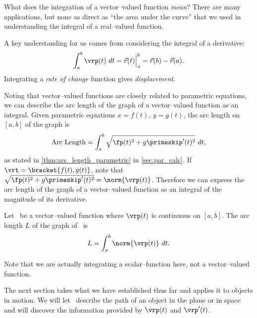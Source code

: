 What does the integration of a vector--valued function \emph{mean}? There are many applications, but none as direct as ``the area under the curve'' that we used in understanding the integral of a real--valued function.

A key understanding for us comes from considering the integral of a derivative: $$\int_a^b \vrp(t)\ dt = \vec r(t)\Big|_a^b = \vec r(b)-\vec r(a).$$ Integrating a \emph{rate of change} function gives \emph{displacement}.

Noting that vector--valued functions are closely related to parametric equations, we can describe the arc length of the graph of a vector--valued function as an integral. Given parametric equations $x=f(t)$, $y=g(t)$, the arc length on $[a,b]$ of the graph is
$$\text{Arc Length} = \int_a^b\sqrt{\fp(t)^2+g\primeskip'(t)^2}\ dt,$$
as stated in \autoref{thm:arc_length_parametric} in \autoref{sec:par_calc}. If $\vrt =\bracket{f(t), g(t)}$, note that $\sqrt{\fp(t)^2+g\primeskip'(t)^2} = \norm{\vrp(t)}$. Therefore we can express the arc length of the graph of a vector--valued function as an integral of the magnitude of its derivative.

{Let \vrt\ be a vector--valued function where $\vrp(t)$ is continuous on $[a,b]$. The arc length $L$ of the graph of \vrt\ is 
$$L = \int_a^b \norm{\vrp(t)}\ dt.$$}

Note that we are actually integrating a scalar--function here, not a vector--valued function.

The next section takes what we have established thus far and applies it to objects in motion. We will let \vrt\ describe the path of an object in the plane or in space and will discover the information provided by $\vrp(t)$ and $\vrp'(t)$.

